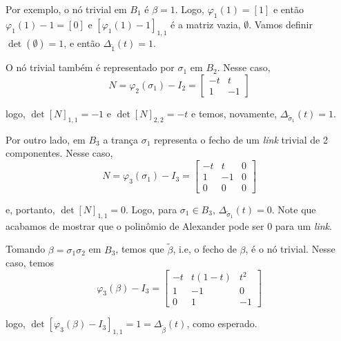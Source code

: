 \documentclass[a4paper,portuguese,11pt,twoside, leqno]{book}
\theoremstyle{definition}
\begin{document}
	\par\vspace{0.3cm} Por exemplo, o nó trivial em $B_1$ é $\beta = 1$. Logo, $\varphi_1(1) = [1]$ e então $\varphi_1(1) - 1 = [0]$ e $[\varphi_1(1) - 1]_{1,1}$ é a matriz vazia, $\emptyset$. Vamos definir $\det(\emptyset) = 1$, e então $\Delta_{\widetilde{1}}(t) = 1$. 
	\par\vspace{0.3cm} O nó trivial também é representado por $\sigma_1$ em $B_2$. Nesse caso, 
	\begin{equation*}
	N = \varphi_2(\sigma_1) - I_2 = \begin{bmatrix}
	-t & t \\
	1 & -1
	\end{bmatrix}
	\end{equation*}
	\par\vspace{0.3cm} logo, $\det[N]_{1,1} = -1$ e $\det[N]_{2,2} = -t$ e temos, novamente, $\Delta_{\widetilde{\sigma}_1}(t) = 1$.
	\par\vspace{0.3cm} Por outro lado, em $B_3$ a trança $\sigma_1$ representa o fecho de um \textit{link} trivial de 2 componentes. Nesse caso, 
	\begin{equation*}
	N = \varphi_3(\sigma_1) - I_3 = \begin{bmatrix}
	-t & t & 0 \\
	1 & -1 & 0 \\
	0 & 0 & 0
	\end{bmatrix}
	\end{equation*}
	\par\vspace{0.3cm} e, portanto, $\det[N]_{1,1} = 0$. Logo, para $\sigma_1\in B_3$, $\Delta_{\widetilde{\sigma}_1}(t) = 0$. Note que acabamos de mostrar que o polinômio de Alexander pode ser $0$ para um \textit{link}.
	\par\vspace{0.3cm} Tomando $\beta = \sigma_1\sigma_2$ em $B_3$, temos que $\widetilde{\beta}$, i.e, o fecho de $\beta$, é o nó trivial. Nesse caso, temos
	\begin{equation*}
	\varphi_3(\beta) - I_3 = \begin{bmatrix}
	-t & t(1-t) & t^2 \\
	1 & -1 & 0 \\
	0 & 1 & -1
	\end{bmatrix}
	\end{equation*}
	\par\vspace{0.3cm} logo, $\det[\varphi_3(\beta)-I_3]_{1,1} = 1 = \Delta_{\widetilde{\beta}}(t)$, como esperado.
\end{document}
